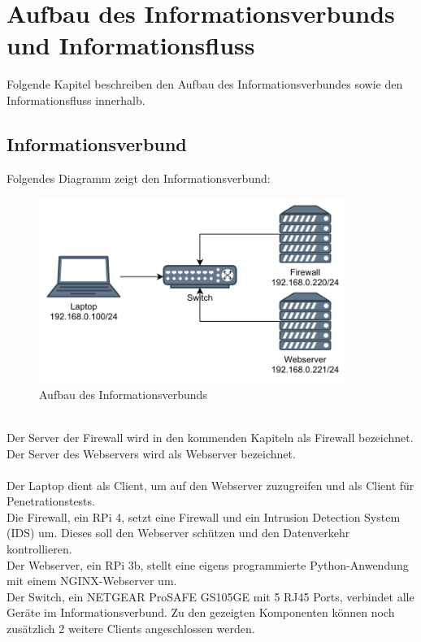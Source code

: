 \documentclass[
    a4paper,
    pagesize,
	pdftex,
    12pt,
]{scrartcl}
\begin{document}
\newpage
\section{Aufbau des Informationsverbunds und Informationsfluss}
Folgende Kapitel beschreiben den Aufbau des Informationsverbundes  sowie den Informationsfluss innerhalb.

\subsection{Informationsverbund}
Folgendes Diagramm zeigt den Informationsverbund:
\begin{figure}[!ht]
	\centering
	\includegraphics[width=10cm]{aufbau-netzwerk.png}
	\caption{Aufbau des Informationsverbunds}
	\label{fig:boat1}
\end{figure}
\\
Der Server der Firewall wird in den kommenden Kapiteln als Firewall bezeichnet. Der Server des Webservers wird als Webserver bezeichnet. \\ \\
Der Laptop dient als Client, um auf den Webserver zuzugreifen und als Client für  Penetrationstests.  \\
Die Firewall, ein RPi 4, setzt eine Firewall und ein  Intrusion Detection System (IDS) um. Dieses soll den Webserver schützen und den Datenverkehr  kontrollieren.  \\
Der Webserver, ein RPi 3b, stellt eine eigens programmierte Python-Anwendung mit einem NGINX-Webserver um. \\
Der Switch, ein  NETGEAR ProSAFE GS105GE mit 5 RJ45 Ports, verbindet alle Geräte im Informationsverbund.  Zu den  gezeigten Komponenten können noch zusätzlich  2 weitere  Clients  angeschlossen werden.

\newpage
\end{document}
